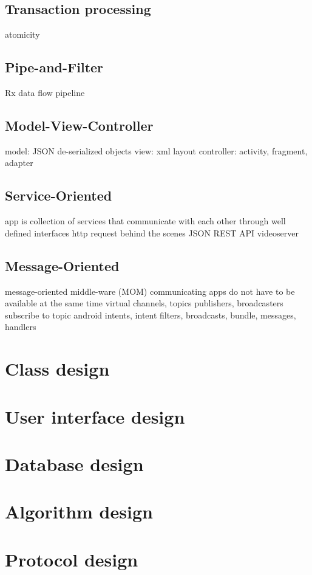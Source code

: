 \subsection{Transaction processing}
atomicity

\subsection{Pipe-and-Filter}
Rx data flow pipeline

\subsection{Model-View-Controller}
model: JSON de-serialized objects
view: xml layout
controller: activity, fragment, adapter

\subsection{Service-Oriented}
app is collection of services that communicate with each other through well defined interfaces
http request behind the scenes
JSON REST API
videoserver

\subsection{Message-Oriented}
message-oriented middle-ware (MOM)
communicating apps do not have to be available at the same time
virtual channels, topics
publishers, broadcasters
subscribe to topic
android intents, intent filters, broadcasts, bundle, messages, handlers

\section{Class design}

\section{User interface design}

\section{Database design}

\section{Algorithm design}

\section{Protocol design}


